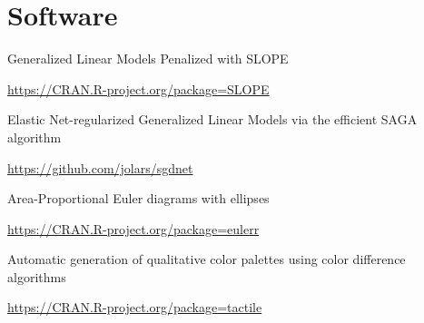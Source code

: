 \documentclass[
  10pt,
  headsepline=true,
  english,
  DIV=12
]{scrartcl}
\renewcommand*{%
  \mkbibnamegiven
}[1]{\ifitemannotation{highlight}{\textbf{#1}}{#1}}
\renewcommand*{%
  \mkbibnamefamily
}[1]{\ifitemannotation{highlight}{\textbf{#1}}{#1}}
\begin{document}
\hypertarget{software}{%
  \section{Software}\label{software}}

\begin{description}[
    labelwidth = \widthof{qualpalr} + 1em,
    leftmargin = \widthof{qualpalr} + 1em,
  ]
  \item[SLOPE] {
        Generalized Linear Models Penalized with SLOPE

        \url{https://CRAN.R-project.org/package=SLOPE}
        }
  \item[sgdnet] {
        Elastic Net-regularized Generalized Linear Models via the efficient
        SAGA algorithm

        \url{https://github.com/jolars/sgdnet}
        }
  \item[eulerr] {
        Area-Proportional Euler diagrams with ellipses

        \url{https://CRAN.R-project.org/package=eulerr}
        }
  \item[qualpalr] {
        Automatic generation of qualitative color palettes using color
        difference algorithms

        \url{https://CRAN.R-project.org/package=tactile}
        }

\end{description}
\end{document}
